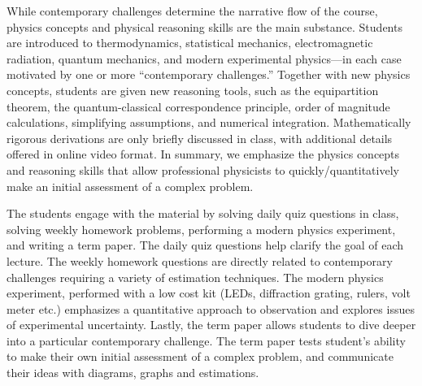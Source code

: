 \documentclass[english,aps,pra,reprint,noshowpacs,superscriptaddress]{revtex4-1}
\begin{document}
While contemporary challenges determine the narrative flow of the
course, physics concepts and physical reasoning skills are the main
substance. Students are introduced to thermodynamics, statistical
mechanics, electromagnetic radiation, quantum mechanics, and modern
experimental physics---in each case motivated by one or more
``contemporary challenges.'' Together with new physics concepts,
students are given new reasoning tools, such as the equipartition
theorem, the quantum-classical correspondence principle, order of
magnitude calculations, simplifying assumptions, and numerical
integration. Mathematically rigorous derivations are only briefly
discussed in class, with additional details offered in online video
format. In summary, we emphasize the physics concepts and reasoning
skills that allow professional physicists to quickly/quantitatively
make an initial assessment of a complex problem.

The students engage with the material by solving daily quiz questions
in class, solving weekly homework problems, performing a modern
physics experiment, and writing a term paper. The daily quiz questions
help clarify the goal of each lecture. The weekly homework questions
are directly related to contemporary challenges requiring a variety
of estimation techniques. The modern physics experiment, performed
with a low cost kit (LEDs, diffraction grating, rulers, volt meter
etc.) emphasizes a quantitative approach to observation and explores
issues of experimental uncertainty. Lastly, the term paper allows
students to dive deeper into a particular contemporary challenge. The
term paper tests student's ability to make their own initial
assessment of a complex problem, and communicate their ideas with
diagrams, graphs and estimations.


\end{document}
